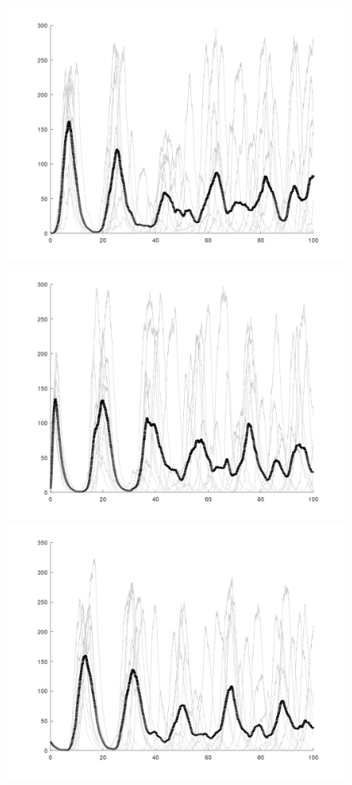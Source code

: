 \documentclass[12pt]{article}
\begin{document}
    \begin{figure}[ht]
    \centering
      \includegraphics[width=\linewidth]{p1.png}
    \endminipage\hfill
      \includegraphics[width=\linewidth]{p2.png}
    \endminipage\hfill
      \includegraphics[width=\linewidth]{p3.png}

\end{figure}
\end{document}
